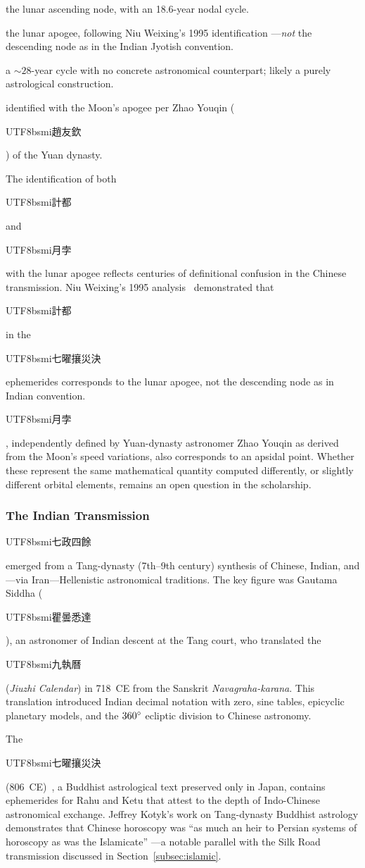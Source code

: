 \documentclass[10pt,a4paper]{article}
\newcommand{\zh}[1]{\begin{CJK}{UTF8}{bsmi}#1\end{CJK}}
\begin{document}
\begin{description}[leftmargin=0pt, labelindent=0pt, nosep]
  \item[\zh{羅睺} (Rahu):] the lunar ascending node, with an 18.6-year
    nodal cycle.
  \item[\zh{計都} (Ketu):] the lunar apogee, following Niu Weixing's 1995
    identification \cite{niu_weixing_1995}---\emph{not} the descending
    node as in the Indian Jyotish convention.
  \item[\zh{紫氣} (Purple Qi):] a ${\sim}28$-year cycle with no concrete
    astronomical counterpart; likely a purely astrological construction.
  \item[\zh{月孛} (Lunar Apogee):] identified with the Moon's apogee per
    Zhao Youqin (\zh{趙友欽}) of the Yuan dynasty.
\end{description}

\noindent
The identification of both \zh{計都} and \zh{月孛} with the lunar apogee
reflects centuries of definitional confusion in the Chinese transmission.
Niu Weixing's 1995 analysis~\cite{niu_weixing_1995} demonstrated that
\zh{計都} in the \zh{七曜攘災決} ephemerides corresponds to the lunar
apogee, not the descending node as in Indian convention. \zh{月孛},
independently defined by Yuan-dynasty astronomer Zhao Youqin as derived
from the Moon's speed variations, also corresponds to an apsidal point.
Whether these represent the same mathematical quantity computed
differently, or slightly different orbital elements, remains an open
question in the scholarship.

\subsubsection{The Indian Transmission}

\zh{七政四餘} emerged from a Tang-dynasty (7th--9th century) synthesis
of Chinese, Indian, and---via Iran---Hellenistic astronomical traditions.
The key figure was Gautama Siddha (\zh{瞿曇悉達}), an astronomer of
Indian descent at the Tang court, who translated the \zh{九執曆}
(\textit{Jiuzhi Calendar}) in 718~CE from the Sanskrit
\textit{Navagraha-karana}. This translation introduced Indian decimal
notation with zero, sine tables, epicyclic planetary models, and the
$360\degree$ ecliptic division to Chinese astronomy.

The \zh{七曜攘災決} (806~CE)~\cite{qiyao_rangzai}, a Buddhist astrological
text preserved only in Japan, contains ephemerides for Rahu and Ketu that
attest to the depth of Indo-Chinese astronomical exchange. Jeffrey Kotyk's work
on Tang-dynasty Buddhist astrology demonstrates that Chinese horoscopy was
``as much an heir to Persian systems of horoscopy as was the
Islamicate'' \cite{kotyk_2017, kotyk_2018}---a notable parallel with the
Silk Road transmission discussed in Section~\ref{subsec:islamic}.
\end{document}
